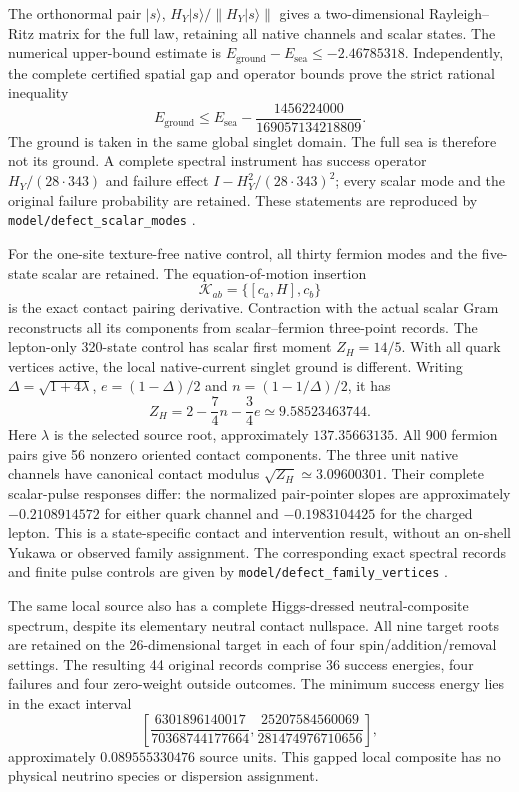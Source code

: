 The orthonormal pair $|s\rangle$, $H_Y|s\rangle/\|H_Y|s\rangle\|$
gives a two-dimensional Rayleigh--Ritz matrix for the full law, retaining
all native channels and scalar states. The numerical upper-bound estimate
is $E_{\mathrm{ground}}-E_{\mathrm{sea}}\le-2.46785318$. Independently,
the complete certified spatial gap and operator bounds prove the strict
rational inequality
\[
 E_{\mathrm{ground}}\le E_{\mathrm{sea}}
 -\frac{1456224000}{169057134218809}.
\]
The ground is taken in the same global singlet domain. The full sea is
therefore not its ground. A complete spectral instrument has success
operator $H_Y/(28\cdot343)$ and failure effect
$I-H_Y^2/(28\cdot343)^2$; every scalar mode and the original failure
probability are retained. These statements are reproduced by
\texttt{model/defect\_scalar\_modes} \cite{ophrepo}.

For the one-site texture-free native control, all thirty fermion modes
and the five-state scalar are retained. The equation-of-motion insertion
\[
 \mathcal K_{ab}=\{[c_a,H],c_b\}
\]
is the exact contact pairing derivative. Contraction with the actual
scalar Gram reconstructs all its components from scalar--fermion
three-point records. The lepton-only 320-state control has scalar first
moment $Z_H=14/5$. With all quark vertices active, the local native-current singlet ground is
different. Writing $\Delta=\sqrt{1+4\lambda}$,
$e=(1-\Delta)/2$ and $n=(1-1/\Delta)/2$, it has
\[
 Z_H=2-\frac74 n-\frac34 e\simeq9.58523463744.
\]
Here $\lambda$ is the selected source root, approximately $137.35663135$.
All 900 fermion pairs give 56 nonzero oriented contact components.
The three unit native channels have canonical contact modulus
$\sqrt{Z_H}\simeq3.09600301$. Their complete scalar-pulse responses differ:
the normalized pair-pointer slopes are approximately $-0.2108914572$
for either quark channel and $-0.1983104425$ for the charged lepton.
This is a state-specific contact and intervention result, without an
on-shell Yukawa or observed family assignment. The corresponding exact
spectral records and finite pulse controls are given by
\texttt{model/defect\_family\_vertices} \cite{ophrepo}.

The same local source also has a complete Higgs-dressed neutral-composite
spectrum, despite its elementary neutral contact nullspace. All nine target
roots are retained on the 26-dimensional target in each of four
spin/addition/removal settings. The resulting 44 original records comprise
36 success energies, four failures and four zero-weight outside outcomes.
The minimum success energy lies in the exact interval
\[
 \left[\frac{6301896140017}{70368744177664},
       \frac{25207584560069}{281474976710656}\right],
\]
approximately $0.089555330476$ source units. This gapped local composite
has no physical neutrino species or dispersion assignment.

